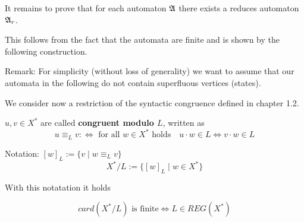 It remains to prove that for each automaton $\mbox{$\mathfrak{A}$}$ there exists a reduces
automaton $\mbox{$\mathfrak{A}$}_r$.

This follows from the fact that the automata are finite and is shown by the
following construction.

Remark: For simplicity (without loss of generality) we want to assume that our
automata in the following do not contain superfluous vertices (states).

We consider now a restriction of the syntactic congruence defined in chapter
1.2.

\begin{definition}
$u, v \in X^*$ are called {\bf congruent modulo $L$}, written as 
\[ u \equiv_L v :\iff \mbox{ for all } w \in X^* \mbox{ holds}\quad u \cdot w
\in L \iff v \cdot w \in L \]
\end{definition}

Notation: $[w]_L := \{ v \mid w \equiv_L v \}$
\[ X^*/L := \{ [w]_L \mid w \in X^* \} \]

With this notatation it holds

\begin{lemma}
\[ card(X^*/L) \mbox{ is finite} \iff L \in REG(X^*) \]
\end{lemma}

